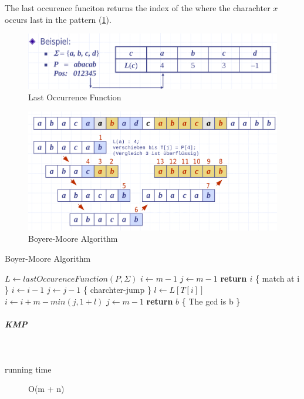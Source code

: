 \documentclass[11pt,twoside,twocolumn,landscape]{article}
\begin{document}
The last occurence funciton returns the index of the where the charachter \(x\) occurs last in the pattern (\ref{fig:orgca53813}).

\begin{figure}[htbp]
\centering
\includegraphics[width=.9\linewidth]{img/lastOccurrence.png}
\caption{\label{fig:orgca53813}Last Occurrence Function}
\end{figure}

\begin{figure}[htbp]
\centering
\includegraphics[width=.9\linewidth]{img/boyere_moore.png}
\caption{Boyere-Moore Algorithm}
\end{figure}


\begin{algorithm}
  \caption{Boyer-Moore Algorithm}
  \begin{algorithmic}[1]
    \State $L \leftarrow lastOccurenceFunction(P, \Sigma)$
    \State $i \leftarrow m - 1$
    \State $j \leftarrow m - 1$
    \Repeat
    \State \textbf{return $i$} \{ match at i \}
    \Else
    \State $i \leftarrow i - 1$
    \State $j \leftarrow j - 1$
    \EndIf
    \State \{ charchter-jump \}
    \State $l \leftarrow L[T[i]]$
    \State $i \leftarrow i + m - min(j, 1 + l)$
    \State $j \leftarrow m - 1$
    \EndIf
    \State \textbf{return} $b$ \{ The gcd is b \}
    \EndProcedure
  \end{algorithmic}
\end{algorithm}

\subparagraph{KMP} \
\label{sec:org57d450e}

\begin{description}
\item[{running time}] O(m + n)
\end{description}
\end{document}
